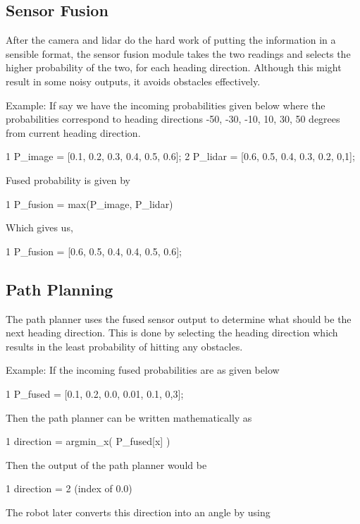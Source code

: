 \subsection*{Sensor Fusion}

After the camera and lidar do the hard work of putting the information in a sensible format, the sensor fusion module takes the two readings and selects the higher probability of the two, for each heading direction. Although this might result in some noisy outputs, it avoids obstacles effectively.

Example\+: If say we have the incoming probabilities given below where the probabilities correspond to heading directions -\/50, -\/30, -\/10, 10, 30, 50 degrees from current heading direction. 
\begin{DoxyCode}
1 P\_image = [0.1, 0.2, 0.3, 0.4, 0.5, 0.6];
2 P\_lidar = [0.6, 0.5, 0.4, 0.3, 0.2, 0,1];
\end{DoxyCode}
 Fused probability is given by 
\begin{DoxyCode}
1 P\_fusion = max(P\_image, P\_lidar)
\end{DoxyCode}
 Which gives us, 
\begin{DoxyCode}
1 P\_fusion = [0.6, 0.5, 0.4, 0.4, 0.5, 0.6];
\end{DoxyCode}


\subsection*{Path Planning}

The path planner uses the fused sensor output to determine what should be the next heading direction. This is done by selecting the heading direction which results in the least probability of hitting any obstacles.

Example\+: If the incoming fused probabilities are as given below 
\begin{DoxyCode}
1 P\_fused = [0.1, 0.2, 0.0, 0.01, 0.1, 0,3];
\end{DoxyCode}
 Then the path planner can be written mathematically as 
\begin{DoxyCode}
1 direction = argmin\_x( P\_fused[x] )
\end{DoxyCode}
 Then the output of the path planner would be 
\begin{DoxyCode}
1 direction = 2 (index of 0.0)
\end{DoxyCode}


The robot later converts this direction into an angle by using


